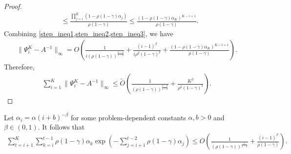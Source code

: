 \documentclass{opt2025} %
\begin{document}
\begin{proof}
\begin{align}
&\leq \frac{\prod_{j=i}^{K}(1-\rho(1-\gamma)\alpha_j)}{\rho(1-\gamma)}  \leq \frac{(1-\rho(1-\gamma)\alpha_K)^{K-i+1}}{\rho(1-\gamma)} \label{step_ineq3}.
\end{align}
Combining \cref{step_ineq1,step_ineq2,step_ineq3}, we have 
\begin{align}
\|\Psi_i^K - A^{-1}\|_{\infty}  = O\left( \frac{1}{i(\rho(1-\gamma))^{\frac{2-\beta}{1-\beta}}}  + \frac{(i-1)^{\beta}}{i\rho^2(1-\gamma)^2} + \frac{(1-\rho(1-\gamma)\alpha_K)^{K-i+1}}{\rho(1-\gamma)}  \right). \label{eqn_psiA}
\end{align}
Therefore,
\begin{align*}
\sum_{i=1}^K\|\Psi_i^K - A^{-1}\|_{\infty}  \leq  \tilde{O}\left( \frac{1}{(\rho(1-\gamma))^{\frac{2-\beta}{1-\beta}}}  + \frac{K^{\beta}}{\rho^2(1-\gamma)^2} \right). 
\end{align*}
\end{proof}


\begin{lemma}
Let $\alpha_i = \alpha{(i + b)^{-\beta}}$ for some problem-dependent constants $\alpha, b > 0$ and $\beta \in (0,1)$. It follows that
\begin{align*}
\sum_{t=i+1}^K \sum_{k=i}^{t-1}  \rho(1-\gamma) \alpha_k \exp\left(-\sum_{j=i+1}^{t-2} \rho(1-\gamma)\alpha_j\right) \leq O\left( \frac{1}{(\rho(1-\gamma))^{\frac{1}{1-\beta}}}  + \frac{(i-1)^{\beta}}{\rho(1-\gamma)}   \right).
\end{align*}
\end{lemma}
\end{document}
